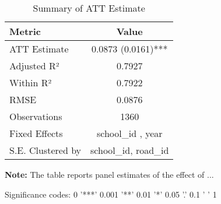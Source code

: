 \begin{table}[H]
\centering
\caption{Summary of ATT Estimate}
\label{tab:SA_cl_50p}
 \begin{center}
 \begin{tabular}{lc}
 \toprule
Metric & Value \\
\midrule
ATT Estimate & 0.0873 (0.0161)*** \\
\hline 
 Adjusted R² & 0.7927 \\
Within R² & 0.7922 \\
RMSE & 0.0876 \\
Observations & 1360 \\
\hline 
 Fixed Effects & school_id ,  year \\
S.E. Clustered by & school_id, road_id \\
\bottomrule
\end{tabular}
 \end{center}\begin{tablenotes}
\small
\item \textbf{Note:} The table reports panel estimates of the effect of ...
\item Significance codes: 0 '***' 0.001 '**' 0.01 '*' 0.05 '.' 0.1 ' ' 1
\end{tablenotes}
\end{table}